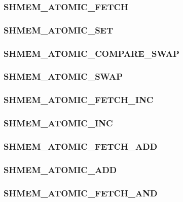 \documentclass[10pt]{book}
\begin{document}
\subsubsection{\textbf{SHMEM\_ATOMIC\_FETCH}}
\label{subsec:shmem_atomic_fetch}


\subsubsection{\textbf{SHMEM\_ATOMIC\_SET}}
\label{subsec:shmem_atomic_set}


\subsubsection{\textbf{SHMEM\_ATOMIC\_COMPARE\_SWAP}}
\label{subsec:shmem_atomic_compare_swap}


\subsubsection{\textbf{SHMEM\_ATOMIC\_SWAP}}
\label{subsec:shmem_atomic_swap}


\subsubsection{\textbf{SHMEM\_ATOMIC\_FETCH\_INC}}
\label{subsec:shmem_atomic_fetch_inc}


\subsubsection{\textbf{SHMEM\_ATOMIC\_INC}}
\label{subsec:shmem_atomic_inc}


\subsubsection{\textbf{SHMEM\_ATOMIC\_FETCH\_ADD}}
\label{subsec:shmem_atomic_fetch_add}


\subsubsection{\textbf{SHMEM\_ATOMIC\_ADD}}
\label{subsec:shmem_atomic_add}


\subsubsection{\textbf{SHMEM\_ATOMIC\_FETCH\_AND}}
\label{subsec:shmem_atomic_fetch_and}

\end{document}
